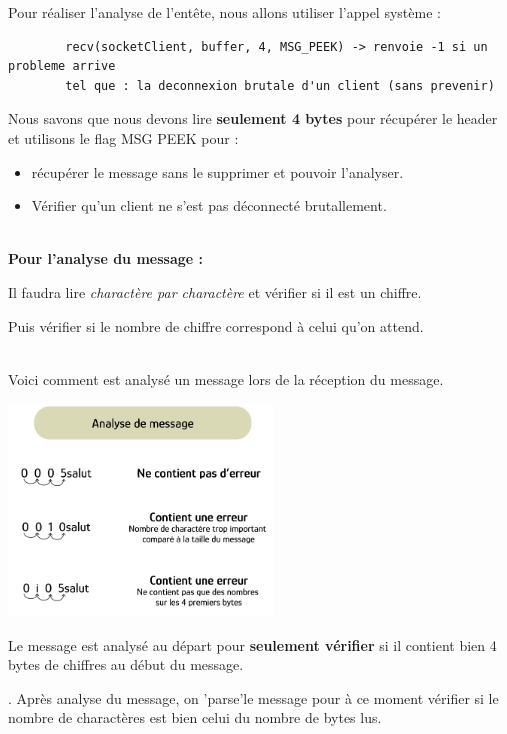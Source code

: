     Pour réaliser l'analyse de l'entête, nous allons utiliser l'appel système :
    \begin{lstlisting}
        recv(socketClient, buffer, 4, MSG_PEEK) -> renvoie -1 si un probleme arrive
        tel que : la deconnexion brutale d'un client (sans prevenir)
    \end{lstlisting}
    Nous savons que nous devons lire \textbf{seulement 4 bytes} pour récupérer le header et utilisons le flag MSG PEEK pour :
    \begin{itemize}
        \item récupérer le message sans le supprimer et pouvoir l'analyser.
        \item Vérifier qu'un client ne s'est pas déconnecté brutallement.
    \end{itemize} \hfill \\



    \textbf{Pour l'analyse du message : } \par
    Il faudra lire \textit{charactère par charactère} et vérifier si il est un chiffre.\par
    Puis vérifier si le nombre de chiffre correspond à celui qu'on attend. \\ \\ \par

    Voici comment est analysé un message lors de la réception du message. 

    {
    \centering
    \includegraphics[width=7cm]{figures/msg_4bytes_ana.png}
    \par
    }

    
    Le message est analysé au départ pour \textbf{seulement vérifier} si il contient bien 4 bytes de chiffres au début du message. \par
    
    . Après analyse du message, on 'parse'le message pour à ce moment vérifier si le 
    \tab[2cm]nombre de charactères est bien celui du nombre de bytes lus. \par

